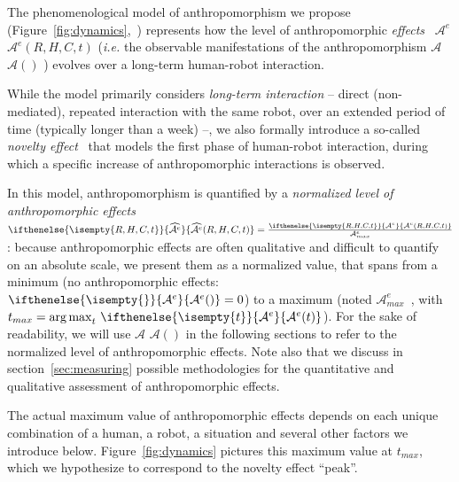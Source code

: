 \documentclass{frontiersSCNS} %
\newcommand{\ie}{\textit{i.e.}\xspace}
\newcommand{\Ant}[1][]{%
      \ifthenelse{\isempty{#1}}%
        {$\mathcal{A}$}
        {$\mathcal{A}(#1)$}
}
\newcommand{\AntE}[1][]{%
      \ifthenelse{\isempty{#1}}%
      {$\mathcal{A}^{e}$}
      {$\mathcal{A}^{e}(#1)$}
}
\newcommand{\antE}[1][]{%
      \ifthenelse{\isempty{#1}}%
      {\mathcal{A}^{e}}
      {\mathcal{A}^{e}(#1)}
}
\newcommand{\antENorm}[1][]{%
      \ifthenelse{\isempty{#1}}%
      {\widehat{\mathcal{A}^{e}}}
      {\widehat{\mathcal{A}^{e}}(#1)}
}
\newcommand{\AntEMax}{{$\mathcal{A}^{e}_{max}$~}}
\newcommand{\antEMax}{{\mathcal{A}^{e}_{max}}}
\begin{document}
The phenomenological model of anthropomorphism we propose
(Figure~\ref{fig:dynamics},~\citep{lemaignan2014dynamics}) represents how the
level of anthropomorphic \emph{effects}~\AntE[R,H,C,t] (\ie the observable
manifestations of the anthropomorphism \Ant) evolves over a long-term human-robot
interaction.

While the model primarily considers \emph{long-term interaction} -- direct
(non-mediated), repeated interaction with the same robot, over an extended
period of time (typically longer than a week) --, we also formally introduce a
so-called \emph{novelty effect}~\citep{kanda_interactive_2004} that models the
first phase of human-robot interaction, during which a specific increase of
anthropomorphic interactions is observed.

In this model, anthropomorphism is quantified
by a \emph{normalized level of anthropomorphic effects} $\antENorm[R,H,C,t] =
\frac{\antE[R,H,C,t]}{\antEMax}$: because anthropomorphic effects are often
qualitative and difficult to quantify on an absolute scale, we present them as a
normalized value, that spans from a minimum (no anthropomorphic effects:
$\antE=0$) to a maximum (noted \AntEMax, with $t_{max} = \operatorname{arg\,max}_t
\, \antE[t]$). For the sake of readability, we will use \Ant in the following
sections to refer to the normalized level of anthropomorphic effects. Note also
that we discuss in section~\ref{sec:measuring} possible methodologies for the
quantitative and qualitative assessment of anthropomorphic effects.

The actual maximum value of anthropomorphic effects depends on each unique
combination of a human, a robot, a situation and several other factors we
introduce below. Figure~\ref{fig:dynamics} pictures this
maximum value at $t_{max}$, which we hypothesize to correspond to the
novelty effect ``peak''.
\end{document}
